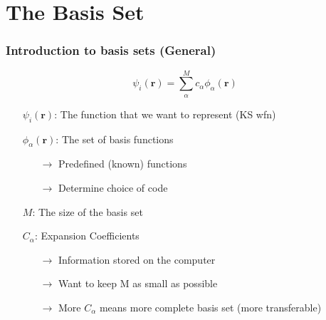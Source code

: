 \documentclass{beamer}
\begin{document}
\begin{frame}
{}

\end{frame}

\section{The Basis Set}

\begin{frame}
\footnotesize
\frametitle{Introduction to basis sets (General)}

\begin{equation}
\psi_i(\mathbf{r}) = \sum_\alpha^M c_\alpha \phi_\alpha(\mathbf{r})
\end{equation}

\begin{center}
\begin{minipage}{0.95\textwidth}
\begin{itemize}
\item[{$\psi_i(\mathbf{r})$}:] The function that we want to represent (KS wfn)
\item[{$\phi_\alpha(\mathbf{r})$}:] The set of basis functions
\begin{itemize}
\item[$\rightarrow$] Predefined (known) functions
\item[$\rightarrow$] Determine choice of code
\end{itemize}
\item[{$M$}:] The size of the basis set
\item[{$C_\alpha$}:] Expansion Coefficients
\begin{itemize}
\item[$\rightarrow$] Information stored on the computer
\item[$\rightarrow$] Want to keep M as small as possible
\item[$\rightarrow$] More $C_\alpha$ means more complete basis set (more transferable)
\end{itemize}
\end{itemize}
\end{minipage}
\end{center}

\end{frame}
\end{document}
